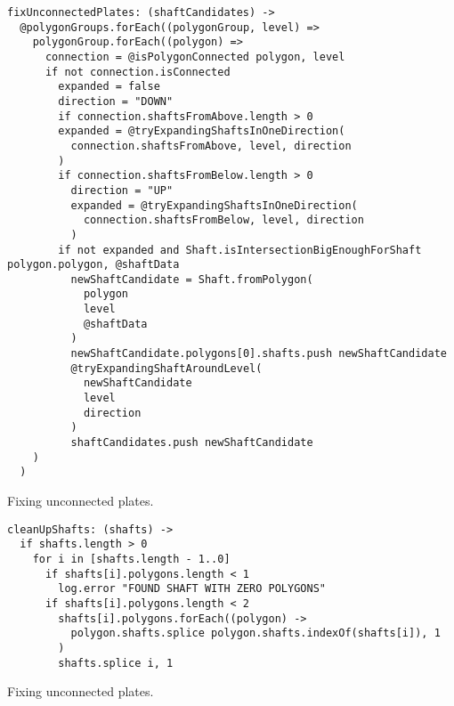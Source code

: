 \documentclass[../ClassicThesis.tex]{subfiles}
\begin{document}
\begin{listing}[ht]
\begin{verbatim}
fixUnconnectedPlates: (shaftCandidates) ->
  @polygonGroups.forEach((polygonGroup, level) =>
    polygonGroup.forEach((polygon) =>
      connection = @isPolygonConnected polygon, level
      if not connection.isConnected
        expanded = false
        direction = "DOWN"
        if connection.shaftsFromAbove.length > 0
        expanded = @tryExpandingShaftsInOneDirection(
          connection.shaftsFromAbove, level, direction
        )
        if connection.shaftsFromBelow.length > 0
          direction = "UP"
          expanded = @tryExpandingShaftsInOneDirection(
            connection.shaftsFromBelow, level, direction
          )
        if not expanded and Shaft.isIntersectionBigEnoughForShaft polygon.polygon, @shaftData
          newShaftCandidate = Shaft.fromPolygon(
            polygon
            level
            @shaftData
          )
          newShaftCandidate.polygons[0].shafts.push newShaftCandidate
          @tryExpandingShaftAroundLevel(
            newShaftCandidate
            level
            direction
          )
          shaftCandidates.push newShaftCandidate
    )
  )
\end{verbatim}
\caption{Fixing unconnected plates.}
\label{lst:findshafts}
\end{listing}

\begin{listing}[ht]
\begin{verbatim}
cleanUpShafts: (shafts) ->
  if shafts.length > 0
    for i in [shafts.length - 1..0]
      if shafts[i].polygons.length < 1
        log.error "FOUND SHAFT WITH ZERO POLYGONS"
      if shafts[i].polygons.length < 2
        shafts[i].polygons.forEach((polygon) ->
          polygon.shafts.splice polygon.shafts.indexOf(shafts[i]), 1
        )
        shafts.splice i, 1
\end{verbatim}
\caption{Fixing unconnected plates.}
\label{lst:findshafts}
\end{listing}
\end{document}
